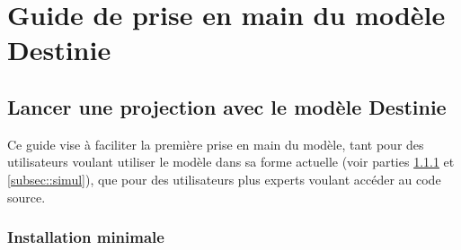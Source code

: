\section{Guide de prise en main du modèle Destinie}
\subsection{Lancer une projection avec le modèle Destinie}
Ce guide vise à faciliter la première prise en main du modèle, tant pour des utilisateurs voulant utiliser le modèle dans sa forme actuelle (voir parties \ref{subsec::instmin} et \ref{subsec::simul}), que pour des utilisateurs plus experts voulant accéder au code source.\\
\subsubsection{Installation minimale}
\label{subsec::instmin}
